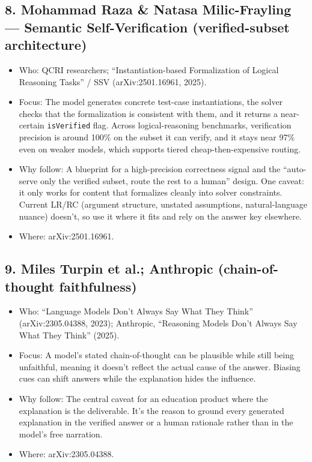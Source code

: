 \documentclass[11pt]{article}
\begin{document}
\subsection*{8. Mohammad Raza \& Natasa Milic-Frayling --- Semantic Self-Verification (verified-subset architecture)}
\begin{itemize}
\item Who: QCRI researchers; \enquote{Instantiation-based Formalization of Logical Reasoning Tasks} / SSV (arXiv:2501.16961, 2025).
\item Focus: The model generates concrete test-case instantiations, the solver checks that the formalization is consistent with them, and it returns a near-certain \texttt{isVerified} flag. Across logical-reasoning benchmarks, verification precision is around 100\% on the subset it can verify, and it stays near 97\% even on weaker models, which supports tiered cheap-then-expensive routing.
\item Why follow: A blueprint for a high-precision correctness signal and the \enquote{auto-serve only the verified subset, route the rest to a human} design. One caveat: it only works for content that formalizes cleanly into solver constraints. Current LR/RC (argument structure, unstated assumptions, natural-language nuance) doesn't, so use it where it fits and rely on the answer key elsewhere.
\item Where: arXiv:2501.16961.
\end{itemize}

\subsection*{9. Miles Turpin et al.; Anthropic (chain-of-thought faithfulness)}
\begin{itemize}
\item Who: \enquote{Language Models Don't Always Say What They Think} (arXiv:2305.04388, 2023); Anthropic, \enquote{Reasoning Models Don't Always Say What They Think} (2025).
\item Focus: A model's stated chain-of-thought can be plausible while still being unfaithful, meaning it doesn't reflect the actual cause of the answer. Biasing cues can shift answers while the explanation hides the influence.
\item Why follow: The central caveat for an education product where the explanation is the deliverable. It's the reason to ground every generated explanation in the verified answer or a human rationale rather than in the model's free narration.
\item Where: arXiv:2305.04388.
\end{itemize}
\end{document}
